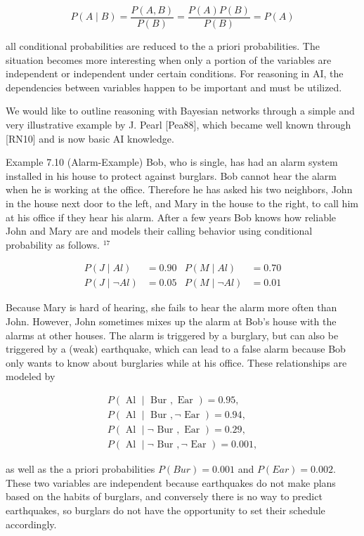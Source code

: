 \documentclass[10pt]{article}
\begin{document}
$$
P(A \mid B)=\frac{P(A, B)}{P(B)}=\frac{P(A) P(B)}{P(B)}=P(A)
$$

all conditional probabilities are reduced to the a priori probabilities. The situation becomes more interesting when only a portion of the variables are independent or independent under certain conditions. For reasoning in AI, the dependencies between variables happen to be important and must be utilized.

We would like to outline reasoning with Bayesian networks through a simple and very illustrative example by J. Pearl [Pea88], which became well known through [RN10] and is now basic AI knowledge.

Example 7.10 (Alarm-Example) Bob, who is single, has had an alarm system installed in his house to protect against burglars. Bob cannot hear the alarm when he is working at the office. Therefore he has asked his two neighbors, John in the house next door to the left, and Mary in the house to the right, to call him at his office if they hear his alarm. After a few years Bob knows how reliable John and Mary are and models their calling behavior using conditional probability as follows. ${ }^{17}$

$$
\begin{array}{rlrl}
P(J \mid A l) & =0.90 & P(M \mid A l) & =0.70 \\
P(J \mid \neg A l) & =0.05 & P(M \mid \neg A l) & =0.01
\end{array}
$$

Because Mary is hard of hearing, she fails to hear the alarm more often than John. However, John sometimes mixes up the alarm at Bob's house with the alarms at other houses. The alarm is triggered by a burglary, but can also be triggered by a (weak) earthquake, which can lead to a false alarm because Bob only wants to know about burglaries while at his office. These relationships are modeled by

$$
\begin{gathered}
P(\text { Al } \mid \text { Bur }, \text { Ear })=0.95, \\
P(\text { Al } \mid \text { Bur }, \neg \text { Ear })=0.94, \\
P(\text { Al } \mid \neg \text { Bur }, \text { Ear })=0.29, \\
P(\text { Al } \mid \neg \text { Bur }, \neg \text { Ear })=0.001,
\end{gathered}
$$

as well as the a priori probabilities $P(B u r)=0.001$ and $P(E a r)=0.002$. These two variables are independent because earthquakes do not make plans based on the habits of burglars, and conversely there is no way to predict earthquakes, so burglars do not have the opportunity to set their schedule accordingly.
\end{document}
